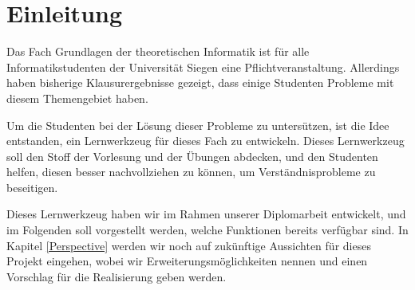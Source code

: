 

\chapter{Einleitung}\label{Introduction}

Das Fach Grundlagen der theoretischen Informatik ist für alle
Informatikstudenten der Universität Siegen eine Pflichtveranstaltung. Allerdings
haben bisherige Klausurergebnisse gezeigt, dass einige Studenten Probleme mit
diesem Themengebiet haben.\vspace{10pt}

Um die Studenten bei der Lösung dieser Probleme zu untersützen, ist die Idee
entstanden, ein Lernwerkzeug für dieses Fach zu entwickeln. Dieses Lernwerkzeug
soll den Stoff der Vorlesung und der Übungen abdecken, und den Studenten helfen,
diesen besser nachvollziehen zu können, um Verständnisprobleme zu
beseitigen.\vspace{10pt}

Dieses Lernwerkzeug haben wir im Rahmen unserer Diplomarbeit entwickelt, und im
Folgenden soll vorgestellt werden, welche Funktionen bereits verfügbar sind. In
Kapitel \ref{Perspective} werden wir noch auf zukünftige Aussichten für dieses
Projekt eingehen, wobei wir Erweiterungsmöglichkeiten nennen und einen Vorschlag
für die Realisierung geben werden.\vspace{10pt}
